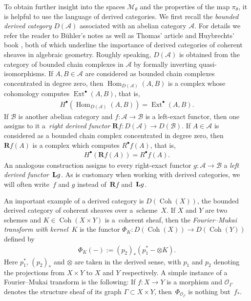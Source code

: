 \documentclass[10pt,a4paper]{amsart}
\numberwithin{equation}{section}
\newcommand{\bL}{{\bf L}}
\newcommand{\sA}{\mathscr{A}}
\newcommand{\sB}{\mathscr{B}}
\newcommand{\sM}{\mathscr{M}}
\newcommand{\sO}{\mathscr{O}}
\newcommand{\Coh}{\operatorname{Coh}}
\newcommand{\Hom}{\operatorname{Hom}}
\newcommand{\Ext}{\operatorname{Ext}}
\begin{document}
To obtain further insight into the spaces $\sM_{\theta}$ and the
properties of the map $\pi_{\theta}$, it is helpful to use the
language of derived categories.  We f\/irst recall the \emph{bounded
  derived category} $D(\sA)$ associated with an abelian category
$\sA$.  For details we refer the reader to B\"uhler's notes
\cite{Buehler2007} as well as Thomas' article \cite{Thomas2001} and
Huybrechts' book \cite{Huybrechts2006}, both of which underline the
importance of derived categories of coherent sheaves in algebraic
geometry.  Roughly speaking, $D(\sA)$ is obtained from the category of
bounded chain complexes in $\sA$ by formally inverting
quasi-isomorphisms.  If $A,B\in\sA$ are considered as bounded chain
complexes concentrated in degree zero, then $\Hom_{D(\sA)}(A,B)$ is a
complex whose cohomology computes $\Ext^\bullet(A,B)$, that is,
\begin{gather*}
  H^\bullet(\Hom_{D(\sA)}(A,B))=\Ext^\bullet(A,B).
\end{gather*}
If $\sB$  is another abelian category and $f\colon \sA \to \sB$ is a
left-exact functor, then one assigns to it a~\emph{right derived
  functor} ${\mathbf R} f \colon D(\sA) \to D(\sB)$.  If $A\in\sA$ is considered
as a bounded chain complex concentrated in degree zero, then ${\mathbf R} f(A)$ is a complex which computes $R^\bullet f(A)$, that is,
\begin{gather*}
  H^\bullet({\mathbf R} f(A))=R^\bullet f(A).
\end{gather*}
An analogous construction assigns to every right-exact functor $g
\colon \sA \to \sB$ a \emph{left derived functor}~$\bL g$.  As is
customary when working with derived categories, we will often write~$f$ and $g$ instead of~${\mathbf R} f$ and~$\bL g$.

An important example of a derived category is $D(\Coh(X))$, the
bounded derived category of coherent sheaves over a~scheme~$X$.  If
$X$ and $Y$ are two schemes and $K\in\Coh(X\times Y)$ is a~co\-he\-rent
sheaf, then the \emph{Fourier--Mukai transform with kernel~$K$} is the
functor $\Phi_K\colon D(\Coh(X))\to D(\Coh(Y))$ def\/ined by
\begin{gather*}
  \Phi_K(-):=(p_2)_*(p_1^*-\otimes K).
\end{gather*}
Here $p_1^*$, $(p_2)_*$ and $\otimes$ are taken in the derived sense,
with $p_1$ and $p_2$ denoting the projections from $X\times Y$ to $X$
and $Y$ respectively. A simple instance of a Fourier--Mukai transform
is the following: If $f\colon X\to Y$ is a morphism and $\sO_\Gamma$
denotes the structure sheaf of its graph $\Gamma\subset X\times Y$,
then~$\Phi_{\sO_\Gamma}$ is nothing but~$f_*$.
\end{document}
